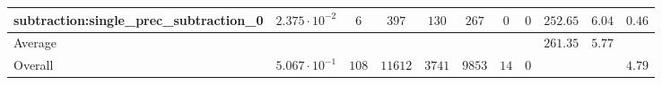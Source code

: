 \begin{tabular}{|l|c|c|c|c|c|c|c|c|c|c|}
subtraction:single\_prec\_subtraction\_0         & $ 2.375 \cdot 10^{-2} $ & $ 6      $ & $ 397   $ & $ 130  $ & $ 267   $ & $ 0  $ & $ 0 $ & $ 252.65      $ & $ 6.04    $ & $ 0.46    $ \\
\hline
Average                                          & $                     $ & $        $ & $       $ & $      $ & $       $ & $    $ & $   $ & $ 261.35      $ & $ 5.77    $ & $         $ \\
\hline
Overall                                          & $ 5.067 \cdot 10^{-1} $ & $ 108    $ & $ 11612 $ & $ 3741 $ & $ 9853  $ & $ 14 $ & $ 0 $ & $             $ & $         $ & $ 4.79    $ \\
\hline
\end{tabular}
